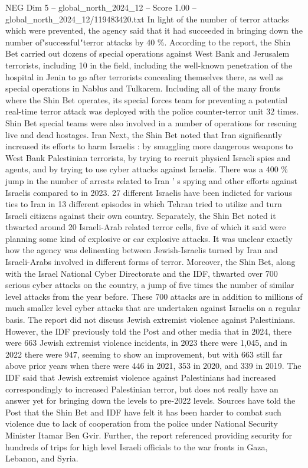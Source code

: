 \begin{textsample}{NEG Dim 5 – global\_north\_2024\_12 – Score 1.00 – global\_north\_2024\_12/119483420.txt}
In light of the number of terror attacks which were prevented, the agency said that it had succeeded in bringing down the number of"successful"terror attacks by 40 \%.
According to the report, the Shin Bet carried out dozens of special operations against West Bank and Jerusalem terrorists, including 10 in the field, including the well-known penetration of the hospital in Jenin to go after terrorists concealing themselves there, as well as special operations in Nablus and Tulkarem.
Including all of the many fronts where the Shin Bet operates, its special forces team for preventing a potential real-time terror attack was deployed with the police counter-terror unit 32 times.
Shin Bet special teams were also involved in a number of operations for rescuing live and dead hostages.
Iran Next, the Shin Bet noted that Iran significantly increased its efforts to harm Israelis : by smuggling more dangerous weapons to West Bank Palestinian terrorists, by trying to recruit physical Israeli spies and agents, and by trying to use cyber attacks against Israelis.
There was a 400 \% jump in the number of arrests related to Iran ' s spying and other efforts against Israelis compared to in 2023. 27 different Israelis have been indicted for various ties to Iran in 13 different episodes in which Tehran tried to utilize and turn Israeli citizens against their own country.
Separately, the Shin Bet noted it thwarted around 20 Israeli-Arab related terror cells, five of which it said were planning some kind of explosive or car explosive attacks.
It was unclear exactly how the agency was delineating between Jewish-Israelis turned by Iran and Israeli-Arabs involved in different forms of terror.
Moreover, the Shin Bet, along with the Israel National Cyber Directorate and the IDF, thwarted over 700 serious cyber attacks on the country, a jump of five times the number of similar level attacks from the year before.
These 700 attacks are in addition to millions of much smaller level cyber attacks that are undertaken against Israelis on a regular basis.
The report did not discuss Jewish extremist violence against Palestinians.
However, the IDF previously told the Post and other media that in 2024, there were 663 Jewish extremist violence incidents, in 2023 there were 1,045, and in 2022 there were 947, seeming to show an improvement, but with 663 still far above prior years when there were 446 in 2021, 353 in 2020, and 339 in 2019.
The IDF said that Jewish extremist violence against Palestinians had increased correspondingly to increased Palestinian terror, but does not really have an answer yet for bringing down the levels to pre-2022 levels.
Sources have told the Post that the Shin Bet and IDF have felt it has been harder to combat such violence due to lack of cooperation from the police under National Security Minister Itamar Ben Gvir.
Further, the report referenced providing security for hundreds of trips for high level Israeli officials to the war fronts in Gaza, Lebanon, and Syria.

\end{textsample}
